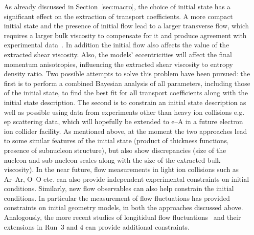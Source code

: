 As already discussed in Section~\ref{sec:macro}, the choice of initial state has 
  a significant effect on the extraction of transport coefficients. 
A more compact initial state and the presence of initial flow lead to a larger 
  transverse flow, which requires a larger bulk viscosity to compensate for it 
  and produce agreement with experimental data~\cite{Schenke:2018fci}. 
%
In addition the initial flow also affects the value of the extracted 
  shear viscosity.
%
Also, the models' eccentricities will affect the final momentum anisotropies, 
  influencing the extracted shear viscosity to entropy density ratio. 
Two possible attempts to solve this problem have been pursued: 
  the first is to perform a combined Bayesian analysis of all parameters, 
  including those of the initial state, to find the best fit for all transport 
  coefficients along with the initial state description.
The second is to constrain an initial state description as well as possible 
  using data from experiments other than heavy ion collisions e.g. ep 
  scattering data, which will hopefully be extended to e--A in a future 
  electron ion collider facility.
As mentioned above, at the moment the two approaches lead to some similar 
  features of the initial state (product of thickness functions, presence 
  of subnucleon structure), but also show discrepancies (size of the nucleon 
  and sub-nucleon scales along with the size of the extracted bulk viscosity). 
In the near future, flow measurements in light ion collisions such as 
  Ar--Ar, O--O etc. can also provide independent experimental constraints 
  on initial conditions. 
Similarly, new flow observables can also help constrain the initial conditions.
In particular the measurement of flow fluctuations has provided constraints
  on initial geometry models, in both the approaches discussed above.
Analogously, the more recent studies of longitidual flow 
  fluctuations~\cite{CMS-HIN-14-012, CMS-HIN-15-008, HION-2016-04}
  and their extensions in Run~3 and 4 can provide additional constraints. 









